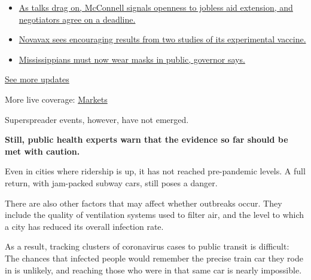 \begin{itemize}
\tightlist
\item
  \href{https://www.nytimes3xbfgragh.onion/2020/08/04/world/coronavirus-cases.html?action=click\&pgtype=Article\&state=default\&region=MAIN_CONTENT_1\&context=storylines_live_updates\#link-762df92}{As
  talks drag on, McConnell signals openness to jobless aid extension,
  and negotiators agree on a deadline.}
\item
  \href{https://www.nytimes3xbfgragh.onion/2020/08/04/world/coronavirus-cases.html?action=click\&pgtype=Article\&state=default\&region=MAIN_CONTENT_1\&context=storylines_live_updates\#link-1228a480}{Novavax
  sees encouraging results from two studies of its experimental
  vaccine.}
\item
  \href{https://www.nytimes3xbfgragh.onion/2020/08/04/world/coronavirus-cases.html?action=click\&pgtype=Article\&state=default\&region=MAIN_CONTENT_1\&context=storylines_live_updates\#link-794484ed}{Mississippians
  must now wear masks in public, governor says.}
\end{itemize}

\href{https://www.nytimes3xbfgragh.onion/2020/08/04/world/coronavirus-cases.html?action=click\&pgtype=Article\&state=default\&region=MAIN_CONTENT_1\&context=storylines_live_updates}{See
more updates}

More live coverage:
\href{https://www.nytimes3xbfgragh.onion/live/2020/08/04/business/stock-market-today-coronavirus?action=click\&pgtype=Article\&state=default\&region=MAIN_CONTENT_1\&context=storylines_live_updates}{Markets}

Superspreader events, however, have not emerged.

\textbf{Still, public health experts warn that the evidence so far
should be met with caution.}

Even in cities where ridership is up, it has not reached pre-pandemic
levels. A full return, with jam-packed subway cars, still poses a
danger.

There are also other factors that may affect whether outbreaks occur.
They include the quality of ventilation systems used to filter air, and
the level to which a city has reduced its overall infection rate.

As a result, tracking clusters of coronavirus cases to public transit is
difficult: The chances that infected people would remember the precise
train car they rode in is unlikely, and reaching those who were in that
same car is nearly impossible.

